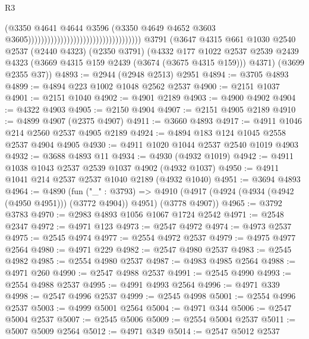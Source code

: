 \begin{lexlean}{R3}
\begin{coremodule}
                                                                      (@3350
                                                                        @4641
                                                                        @4644
                                                                        @3596
                                                                        (@3350
                                                                          @4649
                                                                          @4652
                                                                          @3603
                                                                          @3605)))))))))))))))))))))))))))))))))))
    @3791
    (@3647
      @4315
      @661
      @1030
      @2540
      @2537
      (@2440 @4323)
      (@2350 @3791)
      (@4332
        @177
        @1022
        @2537
        @2539
        @2439
        @4323
        (@3669 @4315 @159 @2439 (@3674 (@3675 @4315 @159)))
        @4371)
      (@3699 @2355 @37))
@4893 := @2944 (@2948 @2513) @2951
@4894 := @3705 @4893
@4899 := @4894 @223 @1002 @1048 @2562 @2537
@4900 := @2151 @1037
@4901 := @2151 @1040
@4902 := @4901 @2189
@4903 := @4900 @4902
@4904 := @4322 @4903
@4905 := @2150 @4904
@4907 := @2151 @4905 @2189
@4910 := @4899 @4907 (@2375 @4907)
@4911 := @3660 @4893
@4917 := @4911 @1046 @214 @2560 @2537 @4905 @2189
@4924 := @4894 @183 @124 @1045 @2558 @2537 @4904 @4905
@4930 := @4911 @1020 @1044 @2537 @2540 @1019 @4903
@4932 := @3688 @4893 @11
@4934 := @4930 (@4932 @1019)
@4942 := @4911 @1038 @1043 @2537 @2539 @1037 @4902 (@4932 @1037)
@4950 := @4911 @1041 @214 @2537 @2537 @1040 @2189 (@4932 @1040)
@4951 := @3694 @4893
@4964 := @4890
    (fun ("_" : @3793) =>
    @4910 (@4917 (@4924 (@4934 (@4942 (@4950 @4951))) (@3772 @4904)) @4951) (@3778 @4907))
@4965 := @3792 @3783
@4970 := @2983 @4893 @1056 @1067 @1724 @2542
@4971 := @2548 @2347
@4972 := @4971 @123
@4973 := @2547 @4972
@4974 := @4973 @2537
@4975 := @2545 @4974
@4977 := @2554 @4972 @2537
@4979 := @4975 @4977 @2564
@4980 := @4971 @229
@4982 := @2547 @4980 @2537
@4983 := @2545 @4982
@4985 := @2554 @4980 @2537
@4987 := @4983 @4985 @2564
@4988 := @4971 @260
@4990 := @2547 @4988 @2537
@4991 := @2545 @4990
@4993 := @2554 @4988 @2537
@4995 := @4991 @4993 @2564
@4996 := @4971 @339
@4998 := @2547 @4996 @2537
@4999 := @2545 @4998
@5001 := @2554 @4996 @2537
@5003 := @4999 @5001 @2564
@5004 := @4971 @344
@5006 := @2547 @5004 @2537
@5007 := @2545 @5006
@5009 := @2554 @5004 @2537
@5011 := @5007 @5009 @2564
@5012 := @4971 @349
@5014 := @2547 @5012 @2537

\end{coremodule}
\end{lexlean}

